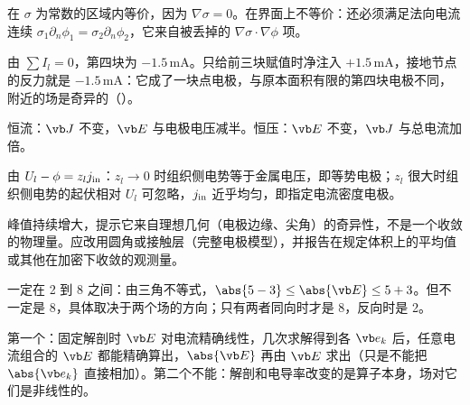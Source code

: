 \begin{answers}
\item 在 $\sigma$ 为常数的区域内等价，因为 $\nabla\sigma=0$。在界面上不等价：还必须满足法向电流连续 $\sigma_1\partial_n\phi_1=\sigma_2\partial_n\phi_2$，它来自被丢掉的 $\nabla\sigma\cdot\nabla\phi$ 项。
\item 由 $\sum I_l=0$，第四块为 $-1.5\,\mathrm{mA}$。只给前三块赋值时净注入 $+1.5\,\mathrm{mA}$，接地节点的反力就是 $-1.5\,\mathrm{mA}$：它成了一块点电极，与原本面积有限的第四块电极不同，附近的场是奇异的（）。
\item 恒流：$\vb J$ 不变，$\vb E$ 与电极电压减半。恒压：$\vb E$ 不变，$\vb J$ 与总电流加倍。
\item 由 $U_l-\phi=z_lj_{\rm in}$：$z_l\to0$ 时组织侧电势等于金属电压，即等势电极；$z_l$ 很大时组织侧电势的起伏相对 $U_l$ 可忽略，$j_{\rm in}$ 近乎均匀，即指定电流密度电极。
\item 峰值持续增大，提示它来自理想几何（电极边缘、尖角）的奇异性，不是一个收敛的物理量。应改用圆角或接触层（完整电极模型），并报告在规定体积上的平均值或其他在加密下收敛的观测量。
\item 一定在 2 到 8 之间：由三角不等式，$\abs{5-3}\le\abs{\vb E}\le5+3$。但不一定是 8，具体取决于两个场的方向；只有两者同向时才是 8，反向时是 2。
\item 第一个：固定解剖时 $\vb E$ 对电流精确线性，几次求解得到各 $\vb e_k$ 后，任意电流组合的 $\vb E$ 都能精确算出，$\abs{\vb E}$ 再由 $\vb E$ 求出（只是不能把 $\abs{\vb e_k}$ 直接相加）。第二个不能：解剖和电导率改变的是算子本身，场对它们是非线性的。
\end{answers}

